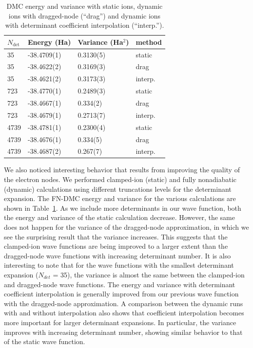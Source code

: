 \begin{table}[h]
\centering
\caption{DMC energy and variance with static ions, dynamic ions with dragged-node (``drag'') and dynamic ions with determinant coefficient interpolation (``interp.'').\label{tab:nad-ch-energy}}
\begin{tabular}{llll}
\hline\hline
$N_{\text{det}}$ & Energy (Ha) & Variance (Ha$^2$) & method \\
\hline
35   & -38.4709(1) &  0.3130(5) &    static \\
35   & -38.4622(2) &  0.3169(3) &   drag \\
35   & -38.4621(2) &  0.3173(3) &  interp. \\
723  & -38.4770(1)&  0.2489(3) &    static \\
723  & -38.4667(1) &  0.334(2)~  &   drag \\
723  & -38.4679(1) &  0.2713(7) &  interp. \\
4739 & -38.4781(1) &  0.2300(4) &    static \\
4739 & -38.4676(1) &  0.334(5)~  &   drag \\
4739 & -38.4687(2) &  0.267(7)~  &  interp. \\
\hline\hline
\end{tabular}
\end{table}

We also noticed interesting behavior that results from improving the quality
of the electron nodes. We performed clamped-ion (static) and fully nonadiabatic
(dynamic) calculations using different truncations levels for the determinant
expansion. The FN-DMC energy and variance for the various calculations are
shown in Table~\ref{tab:nad-ch-energy}. As we include more determinants in our wave function,
both the energy and variance of the static calculation decrease. However, the
same does not happen for the variance of the dragged-node approximation, in
which we see the surprising result that the variance increases. This suggests
that the clamped-ion wave functions are being improved to a larger extent than
the dragged-node wave functions with increasing determinant number. It is also
interesting to note that for the wave functions with the smallest determinant
expansion ($N_{det}$ = 35), the variance is almost the same between the clamped-ion
and dragged-node wave functions.
The energy and variance with determinant coefficient interpolation is
generally improved from our previous wave function with the dragged-node
approximation. A comparison between the dynamic runs with and without
interpolation also shows that coefficient interpolation becomes more important
for larger determinant expansions. In particular, the variance improves with
increasing determinant number, showing similar behavior to that of the static
wave function.

